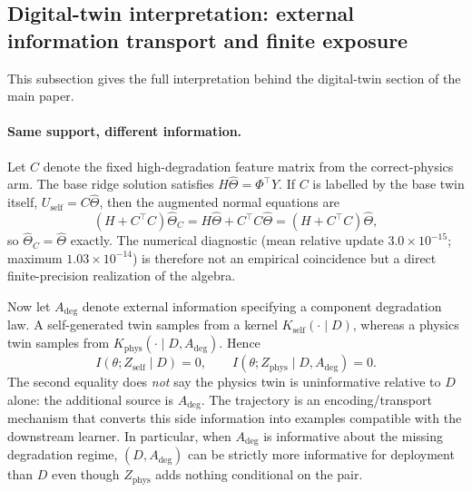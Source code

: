 \subsection{Digital-twin interpretation: external information transport and finite exposure}\label{app:twin-interpretation}
This subsection gives the full interpretation behind the digital-twin section of the main paper.

\paragraph{Same support, different information.}
Let $C$ denote the fixed high-degradation feature matrix from the correct-physics arm. The base ridge solution satisfies $H\widehat\Theta=\Phi^\top Y$. If $C$ is labelled by the base twin itself, $U_{\mathrm{self}}=C\widehat\Theta$, then the augmented normal equations are
\[
(H+C^\top C)\widehat\Theta_C
=H\widehat\Theta+C^\top C\widehat\Theta
=(H+C^\top C)\widehat\Theta,
\]
so $\widehat\Theta_C=\widehat\Theta$ exactly. The numerical diagnostic (mean relative update $3.0\times10^{-15}$; maximum $1.03\times10^{-14}$) is therefore not an empirical coincidence but a direct finite-precision realization of the algebra.

Now let $A_{\mathrm{deg}}$ denote external information specifying a component degradation law. A self-generated twin samples from a kernel $K_{\mathrm{self}}(\cdot\mid D)$, whereas a physics twin samples from $K_{\mathrm{phys}}(\cdot\mid D,A_{\mathrm{deg}})$. Hence
\[
I(\theta;Z_{\mathrm{self}}\mid D)=0,
\qquad
I(\theta;Z_{\mathrm{phys}}\mid D,A_{\mathrm{deg}})=0.
\]
The second equality does \emph{not} say the physics twin is uninformative relative to $D$ alone: the additional source is $A_{\mathrm{deg}}$. The trajectory is an encoding/transport mechanism that converts this side information into examples compatible with the downstream learner. In particular, when $A_{\mathrm{deg}}$ is informative about the missing degradation regime, $(D,A_{\mathrm{deg}})$ can be strictly more informative for deployment than $D$ even though $Z_{\mathrm{phys}}$ adds nothing conditional on the pair.

